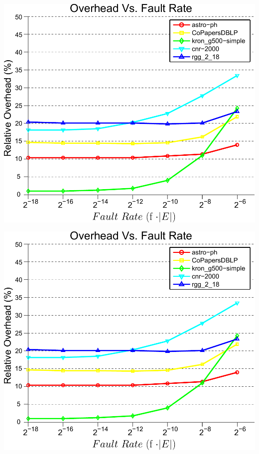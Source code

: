 \lyxframeend{}

\centering
\includegraphics[height=.75\textheight]{plots/plot_overhead_fault-inked}

\lyxframeend{}


\centering
\includegraphics[height=.75\textheight]{plots/plot_overhead_fault-inked}
\lyxframeend{}


